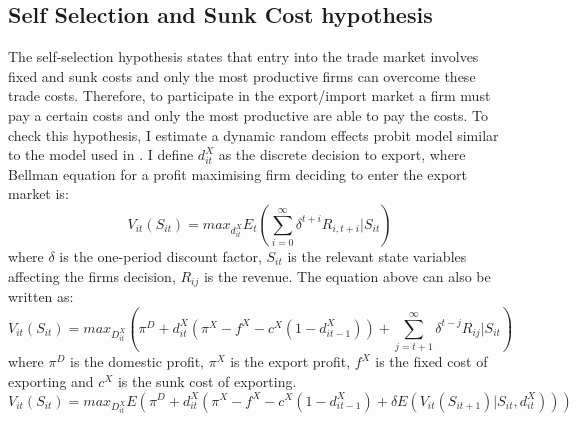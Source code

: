 \documentclass[11pt]{article}
\begin{document}
\subsection{Self Selection and Sunk Cost hypothesis}
The self-selection hypothesis states that entry into the trade market
involves fixed and sunk costs and only the most productive firms can
overcome these trade costs. Therefore, to participate in the
export/import market a firm must pay a certain costs and only the most
productive are able to pay the costs. To check this hypothesis, I
estimate a dynamic random effects probit model similar to the model used
in \textcite{roberts1997decision}. I define $d_{it}^{X}$ as the discrete
decision to export, where
 Bellman equation for a profit maximising firm deciding to enter the
 export market is:
\begin{equation}
V_{it}(S_{it})= max_{d_{it}^{X}}E_{t}(\sum_{i=0}^{\infty} \delta^{t+i}R_{i,t+i}|S_{it})
\end{equation}
 where $\delta$ is the one-period discount factor, $S_{it}$ is the
 relevant state variables affecting the firms decision, $R_{ij}$ is
 the revenue. The equation above can also be written as:
\begin{equation}
V_{it}(S_{it})= max_{D_{it}^{X}}(\pi^{D} + d_{it}^{X}(\pi^{X}- f^{X} -
c^{X}(1-d_{it-1}^{X}))  + \sum_{j=t+1}^{\infty} \delta^{t-j}R_{ij}|S_{it})
\end{equation}
where $\pi^{D}$ is the domestic profit, $\pi^{X}$ is the export
profit, $f^{X}$ is the fixed cost of exporting and $c^{X}$ is the sunk
cost of exporting. 
\begin{equation}
V_{it}(S_{it})= max_{D_{it}^{X}}E(\pi^{D} + d_{it}^{X}(\pi^{X}- f^{X} -
c^{X}(1-d_{it-1}^{X})  + \delta E (V_{it}(S_{it+1})|S_{it}, d_{it}^{X})))
\end{equation}
\end{document}
